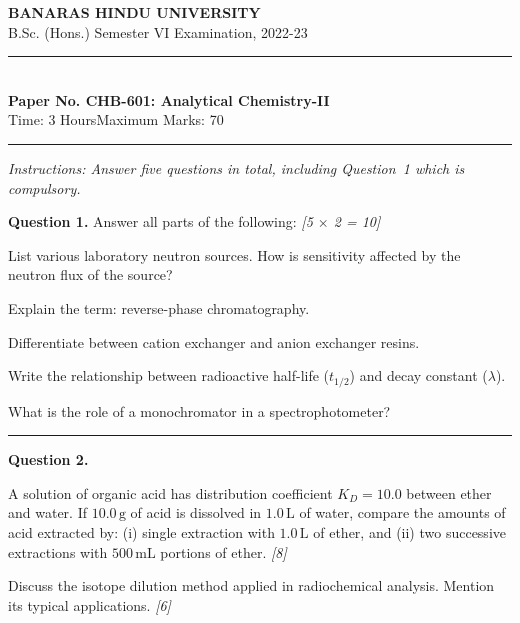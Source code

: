 \documentclass[11pt,a4paper]{article}
\newcommand{\pts}[1]{\hfill   \textit{[#1]}}
\begin{document}
\begin{center}
  {\large\bfseries BANARAS HINDU UNIVERSITY}\\[2pt]
  {\normalsize B.Sc. (Hons.) Semester VI Examination, 2022-23}\\[6pt]
  \rule{0.8\linewidth}{0.5pt}\\[6pt]
  {\large\bfseries Paper No. CHB-601: Analytical Chemistry-II}\\[4pt]
  {\normalsize Time: 3 Hours\hfill Maximum Marks: 70}
\end{center}
\rule{\linewidth}{0.4pt}
\small



\noindent   \textit{Instructions: Answer five questions in total, including Question~1 which is compulsory.}

\normalsize
\bigskip




\noindent   \textbf{Question 1.} Answer all parts of the following: \pts{5 $ \times$ 2 = 10}

\begin{parts}
  \item List various laboratory neutron sources. How is sensitivity affected by the neutron flux of the source?
  \item Explain the term: reverse-phase chromatography.
  \item Differentiate between cation exchanger and anion exchanger resins.
  \item Write the relationship between radioactive half-life ($t_{1/2}$) and decay constant ($\lambda$).
  \item What is the role of a monochromator in a spectrophotometer?
\end{parts}

\medskip\rule{\linewidth}{0.2pt}




\noindent   \textbf{Question 2.}

\begin{parts}
  \item A solution of organic acid has distribution coefficient $K_D = 10.0$ between ether and water. If $10.0\, \text{g}$ of acid is dissolved in $1.0\, \text{L}$ of water, compare the amounts of acid extracted by: (i) single extraction with $1.0\, \text{L}$ of ether, and (ii) two successive extractions with $500\, \text{mL}$ portions of ether. \pts{8}
  \item Discuss the isotope dilution method applied in radiochemical analysis. Mention its typical applications. \pts{6}
\end{parts}
\end{document}
